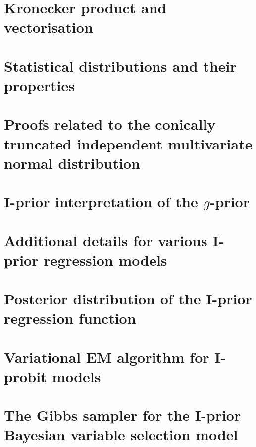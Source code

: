\documentclass[a4paper,showframe,11pt]{report}
\begin{document}

\appendix

%

\chapter{Kronecker product and vectorisation}


\chapter{Statistical distributions and their properties}


\chapter{Proofs related to the conically truncated independent multivariate normal distribution}\label{apx:contrunproof}


\chapter{I-prior interpretation of the $g$-prior}\label{misc:gprior}


\chapter{Additional details for various I-prior regression models}


\chapter{Posterior distribution of the I-prior regression function}


\chapter{Variational EM algorithm for I-probit models}


\chapter{The Gibbs sampler for the I-prior Bayesian variable selection model}\label{apx:gibbsbvs}

 
\hClosingStuffStandalone
\end{document}
